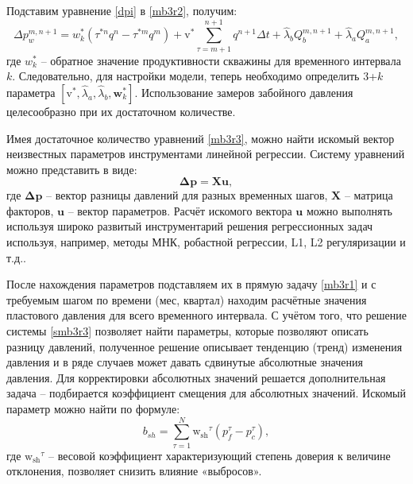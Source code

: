 \documentclass[14pt]{article}
\begin{document}
Подставим уравнение \ref{dpi} в \ref{mb3r2}, получим:
\begin{equation}\label{mb3r3}
	\Delta p_w^{m,n+1} = w_k^* \left(\tau^{*n} q^n - \tau^{*m} q^m \right) + 
	 \mathrm{v}^* \sum_{\tau=m+1}^{n+1}q^{n+1}\Delta t + \hat{\lambda}_b Q^{m,n+1}_b + \hat{\lambda}_a Q^{m,n+1}_a,
\end{equation}
где  $w_k^*$ -- обратное значение продуктивности скважины для временного интервала $k$.
Следовательно, для настройки модели, теперь необходимо определить 3+$k$ параметра $[\mathrm{v}^*, \hat{\lambda}_a, \hat{\lambda}_b, \boldsymbol{w}^*_k]$. Использование замеров забойного давления целесообразно при их достаточном количестве. 

Имея достаточное количество уравнений \ref{mb3r3}, можно найти искомый вектор неизвестных параметров инструментами линейной регрессии. Систему уравнений можно представить в виде:
\begin{equation}\label{smb3r3}
\boldsymbol{\Delta p} = \boldsymbol{X} \boldsymbol{u},
\end{equation}
где $\boldsymbol{\Delta p}$ -- вектор разницы давлений для разных временных шагов, $\boldsymbol{X}$ -- матрица факторов, $\boldsymbol{u}$ -- вектор параметров. 
Расчёт искомого вектора $\boldsymbol{u}$ можно выполнять используя широко развитый инструментарий решения регрессионных задач используя, например, методы МНК, робастной регрессии, L1, L2 регуляризации и т.д..

После нахождения параметров подставляем их в прямую задачу \ref{mb3r1} и с требуемым шагом по времени (мес, квартал) находим расчётные значения пластового давления для всего временного интервала. С учётом того, что решение системы \ref{smb3r3} позволяет найти параметры, которые позволяют описать разницу давлений, полученное решение описывает тенденцию (тренд) изменения давления и в ряде случаев может давать сдвинутые абсолютные значения давления. Для корректировки абсолютных значений решается дополнительная задача -- подбирается коэффициент смещения для абсолютных значений. Искомый параметр можно найти по формуле:
\begin{equation}\label{shift}
	 b_{sh} = \sum_{ \tau=1}^{N}\mathrm{w_{sh}}^\tau\left(p^{\tau}_f - p^{\tau}_c \right),
\end{equation}
где $\mathrm{w_{sh}}^\tau$ -- весовой коэффициент характеризующий степень доверия к величине отклонения, позволяет снизить влияние «выбросов».
\end{document}
